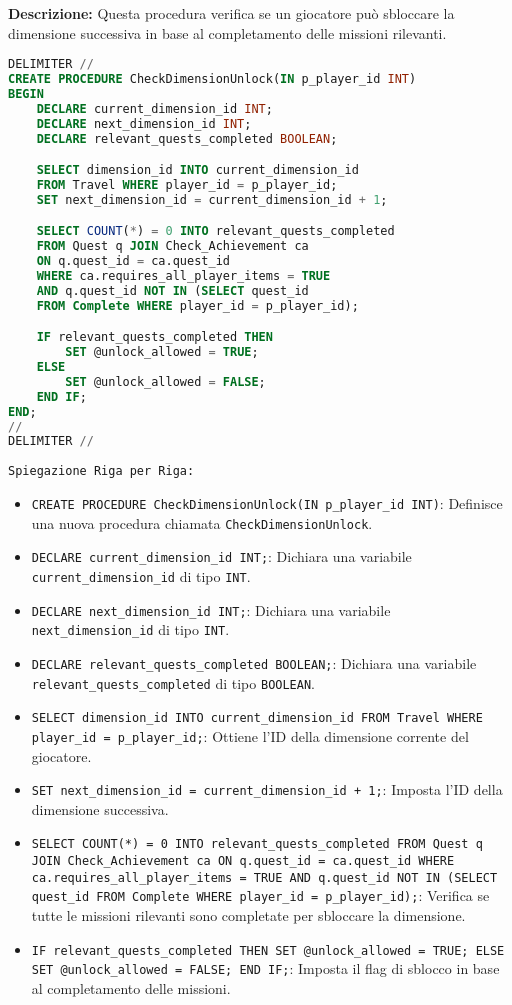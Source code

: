 \documentclass{article}
\begin{document}
\textbf{Descrizione:} Questa procedura verifica se un giocatore può sbloccare la dimensione successiva in base al completamento delle missioni rilevanti.

\begin{lstlisting}[language=SQL]
DELIMITER //
CREATE PROCEDURE CheckDimensionUnlock(IN p_player_id INT)
BEGIN
    DECLARE current_dimension_id INT;
    DECLARE next_dimension_id INT;
    DECLARE relevant_quests_completed BOOLEAN;

    SELECT dimension_id INTO current_dimension_id
    FROM Travel WHERE player_id = p_player_id;
    SET next_dimension_id = current_dimension_id + 1;

    SELECT COUNT(*) = 0 INTO relevant_quests_completed
    FROM Quest q JOIN Check_Achievement ca
    ON q.quest_id = ca.quest_id
    WHERE ca.requires_all_player_items = TRUE
    AND q.quest_id NOT IN (SELECT quest_id
    FROM Complete WHERE player_id = p_player_id);

    IF relevant_quests_completed THEN
        SET @unlock_allowed = TRUE;
    ELSE
        SET @unlock_allowed = FALSE;
    END IF;
END;
//
DELIMITER //
\end{lstlisting}

\texttt{Spiegazione Riga per Riga:}
\begin{itemize}
    \item \lstinline|CREATE PROCEDURE CheckDimensionUnlock(IN p_player_id INT)|: Definisce una nuova procedura chiamata \lstinline|CheckDimensionUnlock|.
    \item \lstinline|DECLARE current_dimension_id INT;|: Dichiara una variabile \lstinline|current_dimension_id| di tipo \lstinline|INT|.
    \item \lstinline|DECLARE next_dimension_id INT;|: Dichiara una variabile \lstinline|next_dimension_id| di tipo \lstinline|INT|.
    \item \lstinline|DECLARE relevant_quests_completed BOOLEAN;|: Dichiara una variabile \lstinline|relevant_quests_completed| di tipo \lstinline|BOOLEAN|.
    \item \lstinline|SELECT dimension_id INTO current_dimension_id FROM Travel WHERE player_id = p_player_id;|: Ottiene l'ID della dimensione corrente del giocatore.
    \item \lstinline|SET next_dimension_id = current_dimension_id + 1;|: Imposta l'ID della dimensione successiva.
    \item \lstinline|SELECT COUNT(*) = 0 INTO relevant_quests_completed FROM Quest q JOIN Check_Achievement ca ON q.quest_id = ca.quest_id WHERE ca.requires_all_player_items = TRUE AND q.quest_id NOT IN (SELECT quest_id FROM Complete WHERE player_id = p_player_id);|: Verifica se tutte le missioni rilevanti sono completate per sbloccare la dimensione.
    \item \lstinline|IF relevant_quests_completed THEN SET @unlock_allowed = TRUE; ELSE SET @unlock_allowed = FALSE; END IF;|: Imposta il flag di sblocco in base al completamento delle missioni.
\end{itemize}
\end{document}
